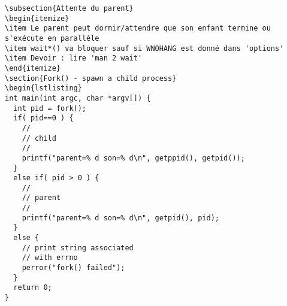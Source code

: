 \documentclass[12pt]{article}
\begin{document}
\begin{lstlisting}
\subsection{Attente du parent}
\begin{itemize}
\item Le parent peut dormir/attendre que son enfant termine ou s'exécute en parallèle
\item wait*() va bloquer sauf si WNOHANG est donné dans 'options'
\item Devoir : lire 'man 2 wait'
\end{itemize}
\section{Fork() - spawn a child process}
\begin{lstlisting}
int main(int argc, char *argv[]) {
  int pid = fork();
  if( pid==0 ) {
    //
    // child
    //
    printf("parent=% d son=% d\n", getppid(), getpid());
  }
  else if( pid > 0 ) {
    //
    // parent
    //
    printf("parent=% d son=% d\n", getpid(), pid);
  }
  else {
    // print string associated
    // with errno
    perror("fork() failed");
  }
  return 0;
}
\end{lstlisting}
\end{document}
